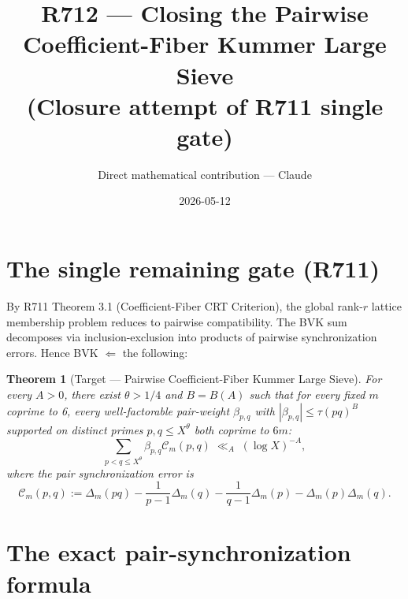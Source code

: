 \documentclass[11pt]{article}
\title{R712 --- Closing the Pairwise Coefficient-Fiber Kummer Large Sieve\\
(Closure attempt of R711 single gate)}
\author{Direct mathematical contribution --- Claude}
\date{2026-05-12}
\newtheorem{theorem}{Theorem}[section]
\begin{document}
\maketitle

\begin{center}
\end{center}

\section{The single remaining gate (R711)}

By R711 Theorem 3.1 (Coefficient-Fiber CRT Criterion), the global rank-$r$ lattice membership problem reduces to pairwise compatibility. The BVK sum decomposes via inclusion-exclusion into products of pairwise synchronization errors. Hence BVK $\Longleftarrow$ the following:

\begin{theorem}[Target --- Pairwise Coefficient-Fiber Kummer Large Sieve]\label{thm:pairwise-target}
For every $A > 0$, there exist $\theta > 1/4$ and $B = B(A)$ such that for every fixed $m$ coprime to 6, every well-factorable pair-weight $\beta_{p,q}$ with $|\beta_{p,q}| \leq \tau(pq)^B$ supported on distinct primes $p, q \leq X^\theta$ both coprime to $6m$:
\begin{equation}\label{eq:pair-target}
\sum_{p < q \leq X^\theta} \beta_{p,q} \mathcal{C}_m(p, q) \;\ll_A\; (\log X)^{-A},
\end{equation}
where the pair synchronization error is
\[
\mathcal{C}_m(p, q) := \Delta_m(pq) - \frac{1}{p-1}\Delta_m(q) - \frac{1}{q-1}\Delta_m(p) - \Delta_m(p)\Delta_m(q).
\]
\end{theorem}

\section{The exact pair-synchronization formula}
\end{document}
